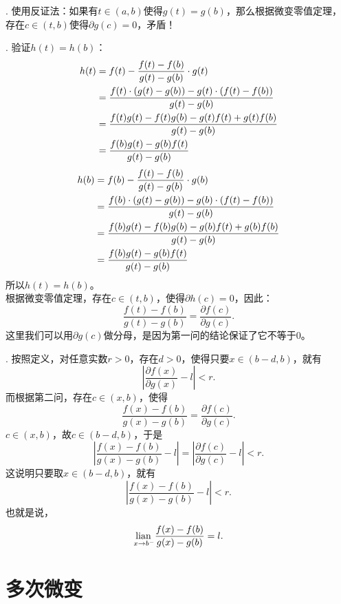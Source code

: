 \documentclass[12pt,UTF8]{ctexbook}
\begin{document}
\begin{so}
    . 使用反证法：如果有$t\in(a, b)$使得$g(t) = g(b)$，那么根据微变零值定理，
    存在$c\in(t, b)$使得$\partial g(c) = 0$，矛盾！

    . 验证$h(t) = h(b)$：
    \begin{align}
        h(t) &= f(t) - \frac{f(t) - f(b)}{g(t) - g(b)} \cdot g(t) \notag \\
        &= \frac{f(t)\cdot \left(g(t) - g(b)\right) - g(t) \cdot \left(f(t) - f(b)\right)}{g(t) - g(b)} \notag \\
        &= \frac{f(t) g(t) - f(t) g(b) - g(t) f(t) + g(t) f(b)}{g(t) - g(b)} \notag \\
        &= \frac{f(b) g(t) - g(b) f(t)}{g(t) - g(b)} \notag 
    \end{align}
    \begin{align}
        h(b) &= f(b) - \frac{f(t) - f(b)}{g(t) - g(b)} \cdot g(b) \notag \\
        &= \frac{f(b)\cdot \left(g(t) - g(b)\right) - g(b) \cdot \left(f(t) - f(b)\right)}{g(t) - g(b)} \notag \\
        &= \frac{f(b) g(t) - f(b) g(b) - g(b) f(t) + g(b) f(b)}{g(t) - g(b)} \notag \\
        &= \frac{f(b) g(t) - g(b) f(t)}{g(t) - g(b)} \notag 
    \end{align}
    所以$h(t) = h(b)$。\\
    根据微变零值定理，存在$c\in(t, b)$，使得$\partial h(c) = 0$，因此：
    $$ \frac{f(t) - f(b)}{g(t) - g(b)} = \frac{\partial f(c)}{\partial g(c)}. $$
    这里我们可以用$\partial g(c)$做分母，是因为第一问的结论保证了它不等于$0$。

    . 按照定义，对任意实数$r > 0$，存在$d > 0$，使得只要$x\in(b - d, b)$，就有
    $$ \left| \frac{\partial f(x)}{\partial g(x)} - l\right| < r.$$
    而根据第二问，存在$c\in(x, b)$，使得
    $$ \frac{f(x) - f(b)}{g(x) - g(b)} = \frac{\partial f(c)}{\partial g(c)}. $$
    $c\in(x, b)$，故$c\in(b - d, b)$，于是
    $$ \left| \frac{f(x) - f(b)}{g(x) - g(b)} - l\right| = \left| \frac{\partial f(c)}{\partial g(c)} - l\right| < r.$$
    这说明只要取$x\in(b - d, b)$，就有
    $$ \left| \frac{f(x) - f(b)}{g(x) - g(b)} - l\right| < r.$$
    也就是说，
    $$ \underset{x\to b^-}{\operatorname{lian}\,}  \frac{f(x) - f(b)}{g(x) - g(b)} = l. $$

\end{so}

\section{多次微变}
\end{document}
